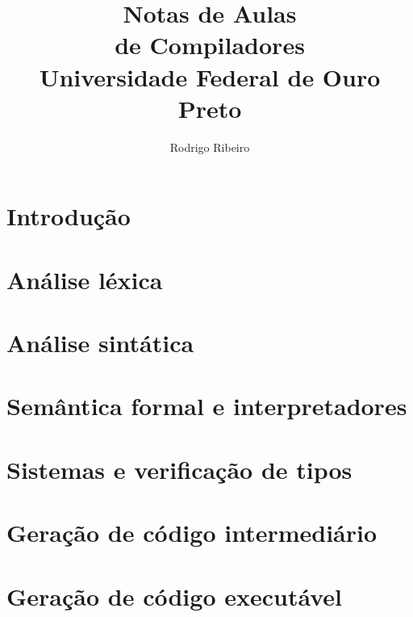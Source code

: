 \documentclass[10pt, a4paper, openany]{book}
\title{%
  \vspace{2cm}
  {\Huge\bfseries Notas de Aulas\\[0.5em] de Compiladores}\\[1em]
  \large Universidade Federal de Ouro Preto
}
\author{Rodrigo Ribeiro}
\date{}
\theoremstyle{remark}
\begin{document}
\maketitle
\tableofcontents
\newpage
\part{Introdução}

\part{Análise léxica}



\part{Análise sintática}







\part{Semântica formal e interpretadores}



\part{Sistemas e verificação de tipos}


\part{Geração de código intermediário}


\part{Geração de código executável}


% 
% 
% 
% 
% 
% 

\end{document}
